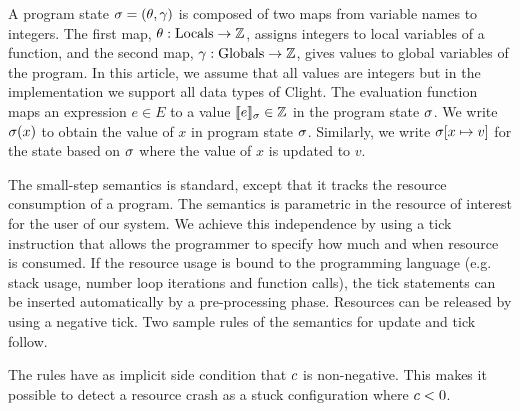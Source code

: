 \documentclass[nocopyrightspace,preprint,pldi]{sigplanconf-pldi15}
\newcommand{\iffull}[2]{\ifx\fullversion\undefined{#2}\else{#1}\fi}
\begin{document}
A program state $\sigma = (\theta, \gamma)$ is composed of two maps
from variable names to integers. The first map, $\theta : \text{Locals}
\to \mathbb{Z}$, assigns integers to local variables of a function, and the
second map, $\gamma : \text{Globals} \to \mathbb{Z}$, gives values to global
variables of the program.  In this article, we assume that all values are
integers but in the implementation we support all data types of Clight.
The evaluation function \evalE{\cdot}{} maps an expression $e \in E$
to a value $\llbracket e \rrbracket_{\sigma} \in \mathbb{Z}$ in the program state $\sigma$.
We write $\sigma(x)$ to obtain the value of $x$ in program state
$\sigma$.
Similarly, we write $\sigma[x \mapsto v]$ for the state based on $\sigma$
where the value of $x$ is updated to $v$.

The small-step semantics is standard, except that it tracks
the resource consumption of a program.  The semantics is parametric in
the resource of interest for the user of our system.  We achieve this
independence by using a tick instruction that allows the programmer
to specify how much and when resource is consumed.  If the resource
usage is bound to the programming language (e.g. stack usage, number
loop iterations and function calls), the tick statements can
be inserted automatically by a pre-processing phase.  Resources can be
released by using a negative tick.
Two sample rules of the semantics for update and tick follow.

The rules have as implicit side condition that $c$ is
non-negative.  This makes it possible to detect a resource crash as a
stuck configuration where $c<0$.
\end{document}
